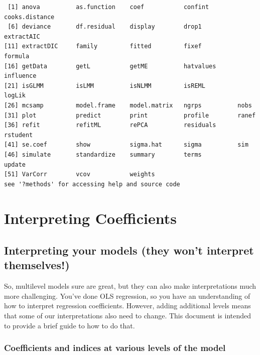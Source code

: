 \documentclass[
  letterpaper,
  DIV=11,
  numbers=noendperiod]{scrreprt}
\begin{document}
\begin{verbatim}
 [1] anova          as.function    coef           confint        cooks.distance
 [6] deviance       df.residual    display        drop1          extractAIC    
[11] extractDIC     family         fitted         fixef          formula       
[16] getData        getL           getME          hatvalues      influence     
[21] isGLMM         isLMM          isNLMM         isREML         logLik        
[26] mcsamp         model.frame    model.matrix   ngrps          nobs          
[31] plot           predict        print          profile        ranef         
[36] refit          refitML        rePCA          residuals      rstudent      
[41] se.coef        show           sigma.hat      sigma          sim           
[46] simulate       standardize    summary        terms          update        
[51] VarCorr        vcov           weights       
see '?methods' for accessing help and source code
\end{verbatim}

\hypertarget{interpreting-coefficients}{%
\chapter{Interpreting Coefficients}\label{interpreting-coefficients}}

\hypertarget{interpreting-your-models-they-wont-interpret-themselves}{%
\section{Interpreting your models (they won't interpret
themselves!)}\label{interpreting-your-models-they-wont-interpret-themselves}}

So, multilevel models sure are great, but they can also make
interpretations much more challenging. You've done OLS regression, so
you have an understanding of how to interpret regression coefficients.
However, adding additional levels means that some of our interpretations
also need to change. This document is intended to provide a brief guide
to how to do that.

\hypertarget{coefficients-and-indices-at-various-levels-of-the-model}{%
\subsection*{Coefficients and indices at various levels of the
model}\label{coefficients-and-indices-at-various-levels-of-the-model}}
\end{document}
